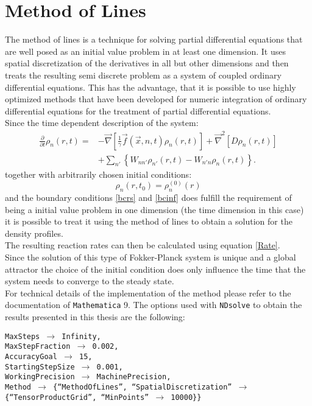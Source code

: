 \section{Method of Lines}
\label{method_of_lines}
The method of lines \cite{pregla1989, saucez2001} is a technique for solving partial differential equations that are well posed as an initial value problem in at least one dimension. It uses spatial discretization of the derivatives in all but other dimensions and then treats the resulting semi discrete problem as a system of coupled ordinary differential equations. This has the advantage, that it is possible to use highly optimized methods that have been developed for numeric integration of ordinary differential equations for the treatment of partial differential equations.\\
Since the time dependent description of the system: 
\begin{align}
    \frac{\partial}{\partial t } \rho_n(r,t) =   &- \vec{ \nabla } \left[\frac{1}{\gamma}\vec{f}(\vec{x},n,t)\rho_n(r,t) \right] +\vec{\nabla}^{2}\left[ D\rho_n(r,t) \right] \nonumber \\
    &+ \sum_{n'} \left\{ W_{nn'}\rho_{n'}(r,t) - W_{n'n}\rho_n(r,t)\right\}.
    \label{fpmeqmol}
\end{align}
together with arbitrarily chosen initial conditions:
\begin{equation}
    \rho_n(r,t_0) = \rho_n^{(0)}(r)
    \label{rho0mol}
\end{equation}
and the boundary conditions \eqref{bcrs} and \eqref{bcinf} does fulfill the requirement of being a initial value problem in one dimension (the time dimension in this case) it is possible to treat it using the method of lines to obtain a solution for the density profiles.\\
The resulting reaction rates can then be calculated using equation \eqref{Rate}.\\
Since the solution of this type of Fokker-Planck system is unique \cite{soize1994} and a global attractor \cite{Efendiev2000} the choice of the initial condition does only influence the time that the system needs to converge to the steady state.\\
For technical details of the implementation of the method please refer to the documentation of {\tt Mathematica} 9\textsuperscript{\textregistered}. The options used with {\tt NDsolve} to obtain the results presented in this thesis are the following:\par
{\tt    MaxSteps $\rightarrow$ Infinity,  \\
        MaxStepFraction $\rightarrow$ 0.002, \\
        AccuracyGoal $\rightarrow$ 15,  \\
        StartingStepSize $\rightarrow$ 0.001, \\
        WorkingPrecision $\rightarrow$ MachinePrecision, \\
        Method $\rightarrow$ \{``MethodOfLines'', ``SpatialDiscretization'' $\rightarrow$ \{``TensorProductGrid'', ``MinPoints'' $\rightarrow$ 10000\}\}}

